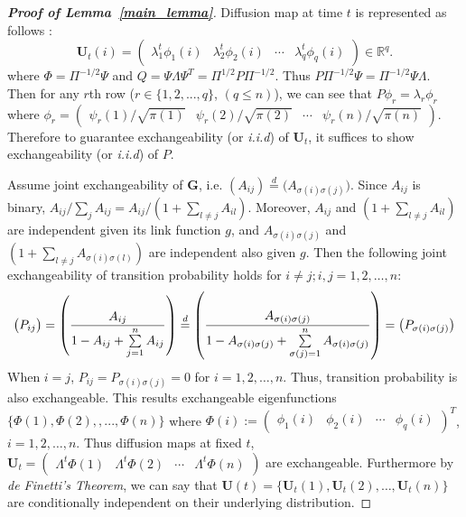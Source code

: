 \documentclass[11pt]{article}
\theoremstyle{definition}
\begin{document}
\begin{proof}[\textbf{Proof of Lemma~\ref{main_lemma}}]
	Diffusion map at time $t$ is represented as follows :
	\begin{equation}
	\mathbf{U}_{t}(i) = \begin{pmatrix} \lambda^{t}_{1} \phi_{1}(i) & \lambda^{t}_{2} \phi_{2} (i)  & \cdots & \lambda^{t}_{q} \phi_{q}(i) \end{pmatrix} \in \mathbb{R}^{q}.
	\end{equation}
	where $\Phi = \Pi^{-1/2}\Psi$ and $Q= \Psi \Lambda \Psi^{T} = \Pi^{1/2} P \Pi^{-1/2}$. 
	Thus $P \Pi^{-1/2} \Psi = \Pi^{-1/2} \Psi \Lambda$. 
	Then for any $r$th row ($r \in \{1,2, ... , q \}$, $(q \leq n)$), we can see that $P \phi_{r} = \lambda_{r} \phi_{r}$  where $\phi_{r} = \begin{pmatrix}  \psi_{r}(1) / \sqrt{\pi(1)} &  \psi_{r}(2) /  \sqrt{\pi(2)} & \cdots & \psi_{r}(n) /  \sqrt{\pi(n)}  \end{pmatrix}$.
	Therefore to guarantee exchangeability (or \textit{i.i.d}) of $\mathbf{U}_{t}$, it suffices to show exchangeability (or \textit{i.i.d}) of $P$.
	
	Assume joint exchangeability of $\mathbf{G}$, i.e. $(A_{ij}) \stackrel{d}{=} \big( A_{\sigma(i) \sigma(j)} \big)$. Since $A_{ij}$ is binary, $A_{ij} / \sum\limits_{j} A_{ij} = A_{ij} /  (1 + \sum\limits_{l \neq j} A_{il})$. Moreover, $A_{ij}$ and $(1 + \sum\limits_{l \neq j} A_{il})$ are independent given its link function $g$, and $A_{\sigma(i) \sigma(j)}$ and $(1 + \sum\limits_{l \neq j} A_{\sigma(i) \sigma(l)})$ are independent also given $g$. Then the following joint exchangeability of transition probability holds for $i \neq j; i,j = 1,2, \ldots,n$:	
	\begin{equation}
		\vspace*{-0.2cm}
	\big( P_{ij} \big) = \left(  \frac{A_{ij}}{1 - A_{ij} + \sum\limits_{j=1}^{n} A_{ij} } \right)  \stackrel{d}{=} \left( \frac{A_{\sigma(i) \sigma(j)} }{1 - A_{\sigma(i) \sigma(j)} + \sum\limits_{\sigma(j) = 1}^{n} A_{\sigma(i) \sigma(j)} } \right) = \big( P_{\sigma(i) \sigma(j)} \big)
	\end{equation}
	When $i = j$, $P_{ij} = P_{\sigma(i) \sigma(j)} = 0$ for $i=1,2, \ldots, n$. Thus, transition probability is also exchangeable. This results exchangeable eigenfunctions $\{ \Phi(1), \Phi(2), , ... , \Phi(n) \}$ where $\Phi(i) := \begin{pmatrix} \phi_{1}(i) & \phi_{2}(i) & \cdots & \phi_{q}(i) \end{pmatrix}^{T}$, $i=1,2, \ldots, n$. Thus diffusion maps at fixed $t$, $\mathbf{U}_{t} = \begin{pmatrix} \Lambda^{t} \Phi(1)  & \Lambda^{t} \Phi(2) & \cdots & \Lambda^{t} \Phi(n)  \end{pmatrix}$ are exchangeable. Furthermore by \textit{de Finetti's Theorem}, we can say that $\mathbf{U}(t) = \{ \mathbf{U}_{t}(1), \mathbf{U}_{t}(2), \ldots, \mathbf{U}_{t}(n)    \}$ are conditionally independent on their underlying distribution.
\end{proof}
\end{document}
